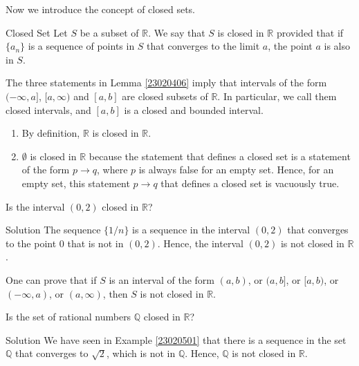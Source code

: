 Now we introduce the concept  of closed sets.
\begin{definition}{Closed Set}
Let $S$ be a subset of $\mathbb{R}$. We say that $S$ is closed in $\mathbb{R}$ provided that if $\{a_n\}$ is a sequence of points in $S$ that converges to the limit $a$, the point $a$ is also in $S$. 
\end{definition}

\begin{example}{}
The three statements in Lemma \ref{23020406} imply that intervals of the form $(-\infty, a]$, $[a, \infty)$ and $[a,b]$ are closed subsets of $\mathbb{R}$. In particular, we call them closed intervals, and $[a,b]$ is a closed and bounded interval.
\end{example}


\begin{remark}{}
\begin{enumerate}[1.]
\item
By definition, $\mathbb{R}$ is closed in $\mathbb{R}$.
\item $\emptyset$ is closed in $\mathbb{R}$ because the statement that defines a closed set is a statement of the form $p\to q$, where $p$ is always false for an empty set. Hence, for an empty set, this statement $p\to q$ that defines a closed set is vacuously true.\end{enumerate}
\end{remark}

\begin{example}[label=23020502]{}
Is the interval $(0,2)$  closed in $\mathbb{R}$?
\end{example}
\begin{solution}{Solution}
The sequence $\{1/n\}$ is a sequence in the interval $(0, 2)$ that converges to the point $0$ that is not in $(0,2)$. Hence, the interval $(0,2)$ is not closed in $\mathbb{R}$.
\end{solution}

\begin{remark}{}
One can prove that if $S$ is an interval of the form $(a, b)$, or $(a, b]$, or $[a, b)$, or $(-\infty, a)$, or $(a, \infty)$, then $S$ is not closed in $\mathbb{R}$.
\end{remark}

\begin{example}{}
Is the set of rational numbers $\mathbb{Q}$ closed in $\mathbb{R}$? 
\end{example}
\begin{solution}{Solution}
We have seen in 
Example \ref{23020501} that there is a sequence in the set $\mathbb{Q}$ that converges to $\sqrt{2}$, which is not in $\mathbb{Q}$. Hence, $\mathbb{Q}$ is not closed in $\mathbb{R}$.
\end{solution}

